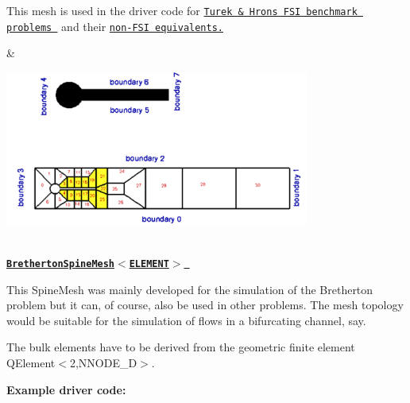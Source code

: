 \begin{center}
\begin{longtabu}
\begin{DoxyItemize}
\item This mesh is used in the driver code for \href{../../../interaction/turek_flag/html/index.html}{\tt Turek \& Hron\textquotesingle{}s F\+SI benchmark problems } and their \href{../../../navier_stokes/turek_flag_non_fsi/html/index.html}{\tt non-\/\+F\+SI equivalents.}
\end{DoxyItemize}& 
\begin{DoxyImageNoCaption}
  \mbox{\includegraphics[width=0.75\textwidth]{cylinder_with_flag_mesh}}
\end{DoxyImageNoCaption}
   \\
\href{classoomph_1_1BrethertonSpineMesh.html}{\tt {\bfseries  Bretherton\+Spine\+Mesh$<$\+E\+L\+E\+M\+E\+N\+T$>$ }} ~\newline
~\newline

\begin{DoxyItemize}
\item This {\ttfamily Spine\+Mesh} was mainly developed for the simulation of the Bretherton problem but it can, of course, also be used in other problems. The mesh topology would be suitable for the simulation of flows in a bifurcating channel, say.
\item The bulk elements have to be derived from the geometric finite element {\ttfamily Q\+Element$<$2,\+N\+N\+O\+D\+E\+\_\+D$>$}.
\end{DoxyItemize}{\bfseries Example driver code\+:} ~\newline


\end{longtabu}
\end{center}
